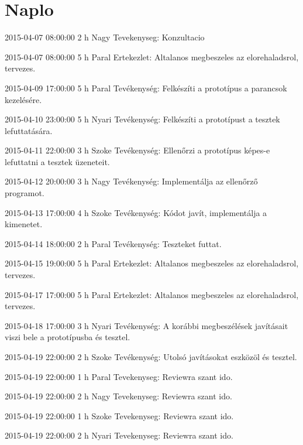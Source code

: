 \section{Naplo}
\begin{naplo}

            {2015-04-07 08:00:00}
            {2 h}
            {Nagy}
            {Tevekenyseg: Konzultacio}

            {2015-04-07 08:00:00}
            {5 h}
            {Paral\newlineNyari\newlineNagy\newlineSzoke}
            {Ertekezlet: Altalanos megbeszeles az elorehaladsrol, tervezes.}

            {2015-04-09 17:00:00}
            {5 h}
            {Paral}
            {Tevékenység: Felkészíti a prototípus a parancsok kezelésére.}

            {2015-04-10 23:00:00}
            {5 h}
            {Nyari}
            {Tevékenység: Felkészíti a prototípust a tesztek lefuttatására.}

            {2015-04-11 22:00:00}
            {3 h}
            {Szoke}
            {Tevékenység: Ellenőrzi a prototípus képes-e lefuttatni a tesztek üzeneteit.}

            {2015-04-12 20:00:00}
            {3 h}
            {Nagy}
            {Tevékenység: Implementálja az ellenőrző programot.}

            {2015-04-13 17:00:00}
            {4 h}
            {Szoke}
            {Tevékenység: Kódot javít, implementálja a kimenetet.}

            {2015-04-14 18:00:00}
            {2 h}
            {Paral}
            {Tevékenység: Teszteket futtat.}

            {2015-04-15 19:00:00}
            {5 h}
            {Paral\newlineNyari\newlineNagy\newlineSzoke}
            {Ertekezlet: Altalanos megbeszeles az elorehaladsrol, tervezes.}

            {2015-04-17 17:00:00}
            {5 h}
            {Paral\newlineNyari\newlineNagy\newlineSzoke}
            {Ertekezlet: Altalanos megbeszeles az elorehaladsrol, tervezes.}

            {2015-04-18 17:00:00}
            {3 h}
            {Nyari}
            {Tevékenység: A korábbi megbeszélések javításait viszi bele a prototípusba és tesztel.}

            {2015-04-19 22:00:00}
            {2 h}
            {Szoke}
            {Tevékenység: Utolsó javításokat eszközöl és tesztel.}

            {2015-04-19 22:00:00}
            {1 h}
            {Paral}
            {Tevekenyseg: Reviewra szant ido.}

            {2015-04-19 22:00:00}
            {2 h}
            {Nagy}
            {Tevekenyseg: Reviewra szant ido.}

            {2015-04-19 22:00:00}
            {1 h}
            {Szoke}
            {Tevekenyseg: Reviewra szant ido.}

            {2015-04-19 22:00:00}
            {2 h}
            {Nyari}
            {Tevekenyseg: Reviewra szant ido.}
\end{naplo}
